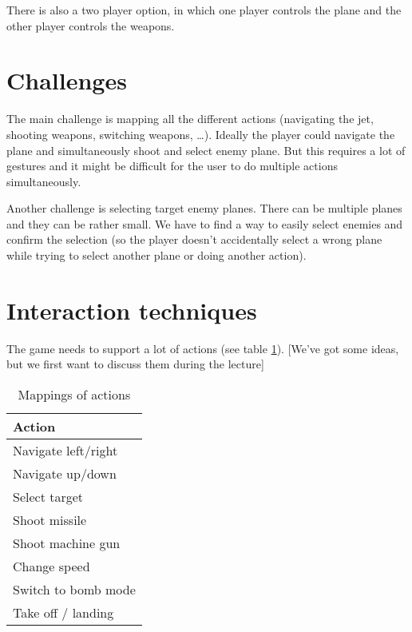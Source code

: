 \documentclass{acm_proc_article-sp}
\begin{document}
There is also a two player option, in which one player controls the plane and the other player controls the weapons.

\section {Challenges}
The main challenge is mapping all the different actions (navigating the jet, shooting weapons, switching weapons, \dots). Ideally the player could navigate the plane and simultaneously shoot and select enemy plane. But this requires a lot of gestures and it might be difficult for the user to do multiple actions simultaneously.

Another challenge is selecting target enemy planes. There can be multiple planes and they can be rather small. We have to find a way to easily select enemies and confirm the selection (so the player doesn't accidentally select a wrong plane while trying to select another plane or doing another action).

\section {Interaction techniques}
The game needs to support a lot of actions (see table \ref{tblActions}).
[We've got some ideas, but we first want to discuss them during the lecture]

\begin{table}
\centering
\caption{Mappings of actions}
\begin{tabular}{|l|} \hline
\bf{Action} \\ \hline
Navigate left/right\\ \hline
Navigate up/down\\ \hline
Select target \\ \hline
Shoot missile \\ \hline
Shoot machine gun \\ \hline
Change speed \\ \hline
Switch to bomb mode \\ \hline
Take off / landing \\ \hline
\end{tabular}
\label{tblActions}
\end{table}

\end{document}
